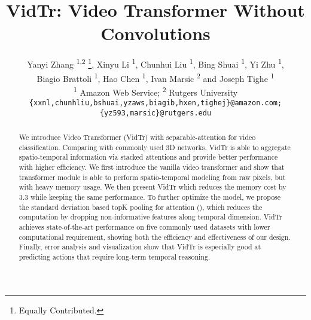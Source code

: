 \documentclass[10pt,twocolumn,letterpaper]{article}
\begin{document}
\title{VidTr: Video Transformer Without Convolutions}

\author{Yanyi Zhang \textsuperscript{\rm 1,2} \thanks{Equally Contributed.}, Xinyu Li \textsuperscript{\rm 1}\footnotemark[1], Chunhui Liu \textsuperscript{\rm 1}, Bing Shuai \textsuperscript{\rm 1}, Yi Zhu \textsuperscript{\rm 1}, \\Biagio Brattoli \textsuperscript{\rm 1}, Hao Chen \textsuperscript{\rm 1}, Ivan Marsic \textsuperscript{\rm 2} and Joseph Tighe \textsuperscript{\rm 1}\\
\textsuperscript{\rm 1} Amazon Web Service; \textsuperscript{\rm 2} Rutgers University\\
{\tt\small \{xxnl,chunhliu,bshuai,yzaws,biagib,hxen,tighej\}@amazon.com; \{yz593,marsic\}@rutgers.edu}
}
 
\maketitle
\ificcvfinal\thispagestyle{empty}\fi

\begin{abstract}
We introduce Video Transformer (VidTr) with separable-attention for video classification. Comparing with commonly used 3D networks, VidTr is able to aggregate spatio-temporal information via stacked attentions and provide better performance with higher efficiency. 
We first introduce the vanilla video transformer and show that transformer module is able to perform spatio-temporal modeling from raw pixels, but with heavy memory usage.
We then present VidTr which reduces the memory cost by 3.3 while keeping the same performance. 
To further optimize the model, we propose the standard deviation based topK pooling for attention (), which reduces the computation by dropping non-informative features along temporal dimension.
VidTr achieves state-of-the-art performance on five commonly used datasets with lower computational requirement, showing both the efficiency and effectiveness of our design.
Finally, error analysis and visualization show that VidTr is especially good at predicting actions that require long-term temporal reasoning.
\end{abstract}
\end{document}
